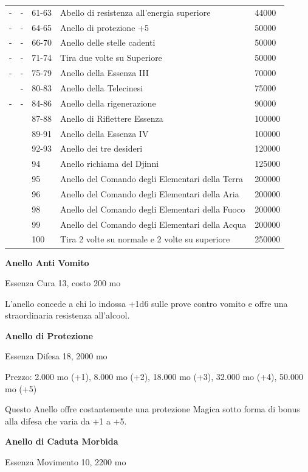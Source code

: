 \documentclass[a4paper,11pt,twoside,openany]{dndbook}
\begin{document}
{\begin{tabular}[c]{@{}lllll@{}}
- & - & 61-63 & Abello di resistenza all'energia superiore & 44000\tabularnewline
- & - & 64-65 & Anello di protezione +5 & 50000\tabularnewline
- & - & 66-70 & Anello delle stelle cadenti \index{nello delle stelle cadenti} & 50000\tabularnewline
- & - & 71-74 & Tira due volte su Superiore & 50000\tabularnewline
- & - & 75-79 & Anello della Essenza III & 70000\tabularnewline
 & - & 80-83 & Anello della Telecinesi \index{Anello della Telecinesi} & 75000\tabularnewline
- & - & 84-86 & Anello della rigenerazione \index{Anello della rigenerazione}& 90000\tabularnewline
 & & 87-88 & Anello di Riflettere Essenza\index{Anello di Riflettere Essenza} & 100000\tabularnewline
 & & 89-91 & Anello della Essenza IV & 100000\tabularnewline
 & & 92-93 & Anello dei tre desideri \index{Anello dei tre desideri} & 120000\tabularnewline
 & & 94 & Anello richiama del Djinni \index{Anello richiama del Djinni} & 125000\tabularnewline
 & & 95 & Anello del Comando degli Elementari della Terra \index{Anello del Comando degli Elementari della Terra}& 200000\tabularnewline
 & & 96 & Anello del Comando degli Elementari della Aria\index{Anello del Comando degli Elementari della Aria} & 200000\tabularnewline
 & & 98 & Anello del Comando degli Elementari della Fuoco \index{Anello del Comando degli Elementari della Fuoco} & 200000\tabularnewline
 & & 99 & Anello del Comando degli Elementari della Acqua \index{Anello del Comando degli Elementari della Acqua} & 200000\tabularnewline
 & & 100 & Tira 2 volte su normale e 2 volte su superiore & 250000\tabularnewline
\bottomrule
\end{tabular}

\bigskip

\textbf{Anello Anti Vomito}

Essenza Cura 13, costo 200 mo

L'anello concede a chi lo indossa +1d6 sulle prove contro vomito e offre una straordinaria resistenza all'alcool.

\textbf{Anello di Protezione}

Essenza Difesa 18, 2000 mo

Prezzo: 2.000 mo (+1), 8.000 mo (+2), 18.000 mo (+3), 32.000 mo (+4),
50.000 mo (+5)

Questo Anello offre costantemente una protezione Magica sotto forma di bonus alla difesa che varia da +1 a +5.

\textbf{Anello di Caduta Morbida}

Essenza Movimento 10, 2200 mo

}
\end{document}
